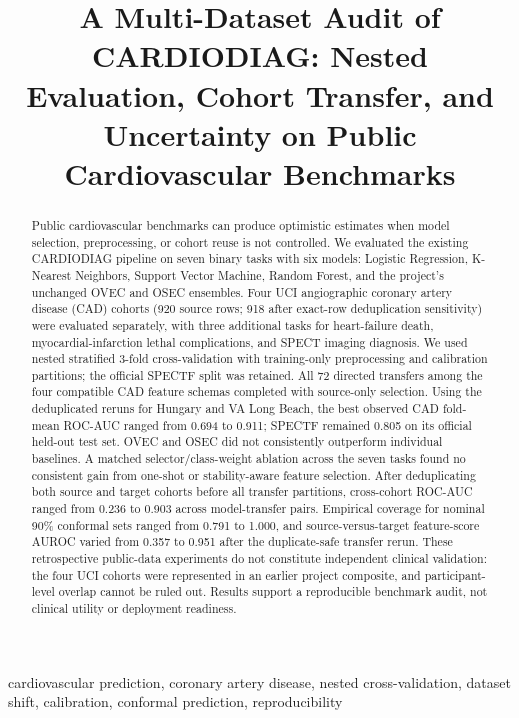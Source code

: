 \documentclass[conference]{IEEEtran}
\title{A Multi-Dataset Audit of CARDIODIAG: Nested Evaluation, Cohort Transfer, and Uncertainty on Public Cardiovascular Benchmarks}
\author{\IEEEauthorblockN{Akhil Preetham E, Ch Hari Krishna, and G Vennela}
\IEEEauthorblockA{Department of Computer Science and Engineering\\
Prasad V. Potluri Siddhartha Institute of Technology, Vijayawada, India\\
\textit{Author order, individual affiliations, contributions, and declarations require confirmation}}}
\begin{document}
\maketitle

\begin{abstract}
Public cardiovascular benchmarks can produce optimistic estimates when model selection, preprocessing, or cohort reuse is not controlled. We evaluated the existing CARDIODIAG pipeline on seven binary tasks with six models: Logistic Regression, K-Nearest Neighbors, Support Vector Machine, Random Forest, and the project’s unchanged OVEC and OSEC ensembles. Four UCI angiographic coronary artery disease (CAD) cohorts (920 source rows; 918 after exact-row deduplication sensitivity) were evaluated separately, with three additional tasks for heart-failure death, myocardial-infarction lethal complications, and SPECT imaging diagnosis. We used nested stratified 3-fold cross-validation with training-only preprocessing and calibration partitions; the official SPECTF split was retained. All 72 directed transfers among the four compatible CAD feature schemas completed with source-only selection. Using the deduplicated reruns for Hungary and VA Long Beach, the best observed CAD fold-mean ROC-AUC ranged from 0.694 to 0.911; SPECTF remained 0.805 on its official held-out test set. OVEC and OSEC did not consistently outperform individual baselines. A matched selector/class-weight ablation across the seven tasks found no consistent gain from one-shot or stability-aware feature selection. After deduplicating both source and target cohorts before all transfer partitions, cross-cohort ROC-AUC ranged from 0.236 to 0.903 across model-transfer pairs. Empirical coverage for nominal 90\% conformal sets ranged from 0.791 to 1.000, and source-versus-target feature-score AUROC varied from 0.357 to 0.951 after the duplicate-safe transfer rerun. These retrospective public-data experiments do not constitute independent clinical validation: the four UCI cohorts were represented in an earlier project composite, and participant-level overlap cannot be ruled out. Results support a reproducible benchmark audit, not clinical utility or deployment readiness.
\end{abstract}

\begin{IEEEkeywords}
cardiovascular prediction, coronary artery disease, nested cross-validation, dataset shift, calibration, conformal prediction, reproducibility
\end{IEEEkeywords}
\end{document}

